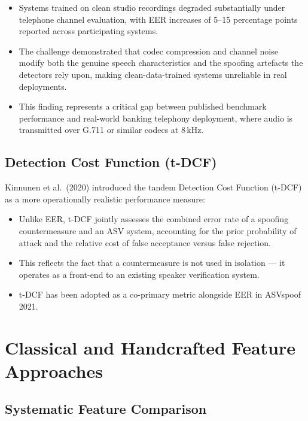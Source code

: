 \documentclass[12pt,a4paper]{article}
\begin{document}
\begin{itemize}
  \item Systems trained on clean studio recordings degraded substantially under telephone
    channel evaluation, with EER increases of 5--15 percentage points reported across
    participating systems.
  \item The challenge demonstrated that codec compression and channel noise modify both the
    genuine speech characteristics and the spoofing artefacts the detectors rely upon,
    making clean-data-trained systems unreliable in real deployments.
  \item This finding represents a critical gap between published benchmark performance and
    real-world banking telephony deployment, where audio is transmitted over G.711 or
    similar codecs at 8\,kHz.
\end{itemize}

\subsection{Detection Cost Function (t-DCF)}

Kinnunen et al.\ (2020) introduced the tandem Detection Cost Function (t-DCF) as a more
operationally realistic performance measure:

\begin{itemize}
  \item Unlike EER, t-DCF jointly assesses the combined error rate of a spoofing
    countermeasure and an ASV system, accounting for the prior probability of attack and
    the relative cost of false acceptance versus false rejection.
  \item This reflects the fact that a countermeasure is not used in isolation --- it
    operates as a front-end to an existing speaker verification system.
  \item t-DCF has been adopted as a co-primary metric alongside EER in ASVspoof 2021.
\end{itemize}

\section{Classical and Handcrafted Feature Approaches}

\subsection{Systematic Feature Comparison}
\end{document}
